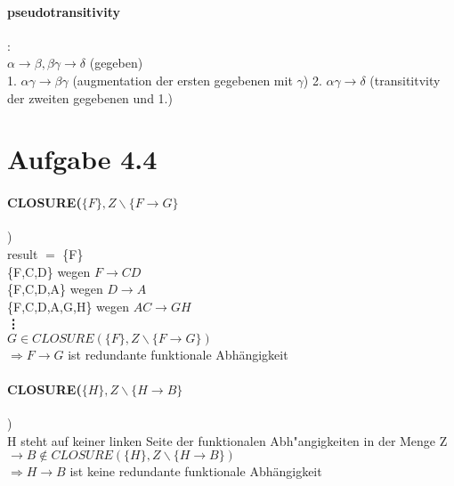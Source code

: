 \documentclass{article}
\begin{document}
		\paragraph*{pseudotransitivity}:\\
			$\alpha \rightarrow \beta, \beta\gamma \rightarrow \delta$ \hspace*{25mm} (gegeben)\\
			1. $ \alpha\gamma \rightarrow \beta\gamma $ \hspace*{29mm} (augmentation der ersten gegebenen mit $\gamma$)
			2. $\alpha \gamma \rightarrow \delta$ \hspace*{31mm} (transititvity der zweiten gegebenen und 1.)\\
			
			
		
		
	\section*{Aufgabe 4.4}
		\paragraph*{CLOSURE($\{ F \}, Z\backslash\{F \longrightarrow G\}$})\\
		result $=$ \{F\}\\
		
			\{F,C,D\} \hspace*{42mm} wegen $F \rightarrow CD$\\
			
			\{F,C,D,A\} \hspace*{39mm} wegen $D \rightarrow A$\\
			
			\{F,C,D,A,G,H\} \hspace*{32mm} wegen $AC \rightarrow GH$\\
			
			\hspace*{11mm}\textbf{\vdots}\\[1.2em]
			$G \in CLOSURE(\{F\}, Z \backslash \{F \longrightarrow G\})$\\
			$\Rightarrow F \rightarrow G$ ist redundante funktionale Abhängigkeit
	
		\paragraph*{CLOSURE($\{H\}, Z \backslash \{H \rightarrow B\}$})\\
		H steht auf keiner linken Seite der funktionalen Abh"angigkeiten in der Menge Z\\
		$\rightarrow B \notin CLOSURE(\{H\}, Z \backslash \{H \rightarrow B\})$\\ $\Rightarrow H \rightarrow B$ ist keine redundante funktionale Abhängigkeit
		
	
	
\end{document}
